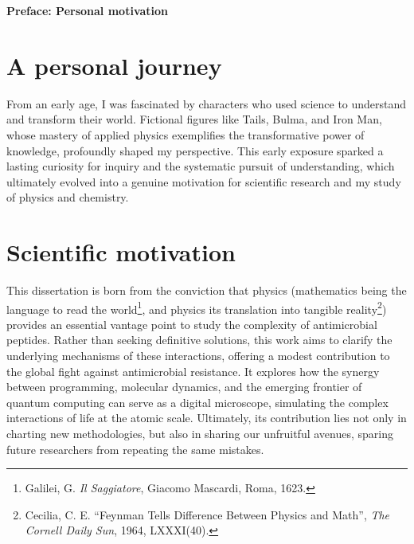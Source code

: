 \clearpage
\thispagestyle{plain}
\pagestyle{fancy}

\vspace*{1cm}
{\Huge\bfseries\raggedleft Preface: Personal motivation \par}
\vspace{1.5cm}
{}

\section*{A personal journey}
From an early age, I was fascinated by characters who used science to understand and transform their world. Fictional figures like Tails, Bulma, and Iron Man, whose mastery of applied physics exemplifies the transformative power of knowledge, profoundly shaped my perspective. This early exposure sparked a lasting curiosity for inquiry and the systematic pursuit of understanding, which ultimately evolved into a genuine motivation for scientific research and my study of physics and chemistry.

\section*{Scientific motivation}
This dissertation is born from the conviction that physics (mathematics being the language to read the world\footnote{Galilei, G. \textit{Il Saggiatore}, Giacomo Mascardi, Roma, 1623.}, and physics its translation into tangible reality\footnote{Cecilia, C. E. ``Feynman Tells Difference Between Physics and Math'', \textit{The Cornell Daily Sun}, 1964, LXXXI(40).}) provides an essential vantage point to study the complexity of antimicrobial peptides. Rather than seeking definitive solutions, this work aims to clarify the underlying mechanisms of these interactions, offering a modest contribution to the global fight against antimicrobial resistance. It explores how the synergy between programming, molecular dynamics, and the emerging frontier of quantum computing can serve as a digital microscope, simulating the complex interactions of life at the atomic scale. Ultimately, its contribution lies not only in charting new methodologies, but also in sharing our unfruitful avenues, sparing future researchers from repeating the same mistakes.
